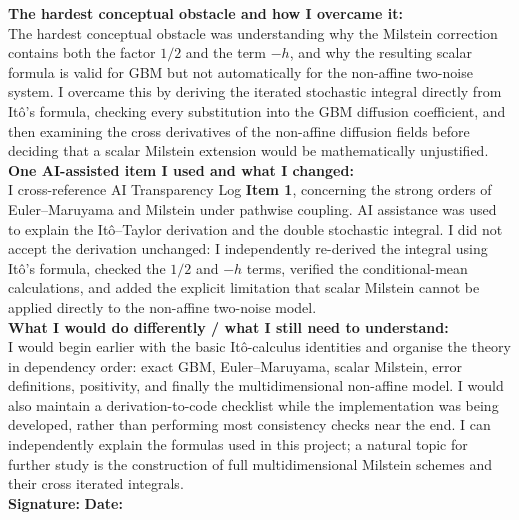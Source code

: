 \documentclass[11pt,a4paper]{article}
\theoremstyle{definition}
\theoremstyle{remark}
\begin{document}
\begin{formbox}
\begin{enumerate}[leftmargin=2em]
\end{enumerate}

\textbf{The hardest conceptual obstacle and how I overcame it:}\\
The hardest conceptual obstacle was understanding why the Milstein correction
contains both the factor $1/2$ and the term $-h$, and why the resulting scalar
formula is valid for GBM but not automatically for the non-affine two-noise
system. I overcame this by deriving the iterated stochastic integral directly
from It\^o's formula, checking every substitution into the GBM diffusion
coefficient, and then examining the cross derivatives of the non-affine
diffusion fields before deciding that a scalar Milstein extension would be
mathematically unjustified.\\[0.4em]

\textbf{One AI-assisted item I used and what I changed:}\\
I cross-reference AI Transparency Log \textbf{Item 1}, concerning the strong
orders of Euler--Maruyama and Milstein under pathwise coupling. AI assistance
was used to explain the It\^o--Taylor derivation and the double stochastic
integral. I did not accept the derivation unchanged: I independently
re-derived the integral using It\^o's formula, checked the $1/2$ and $-h$
terms, verified the conditional-mean calculations, and added the explicit
limitation that scalar Milstein cannot be applied directly to the non-affine
two-noise model.\\[0.4em]

\textbf{What I would do differently / what I still need to understand:}\\
I would begin earlier with the basic It\^o-calculus identities and organise
the theory in dependency order: exact GBM, Euler--Maruyama, scalar Milstein,
error definitions, positivity, and finally the multidimensional non-affine
model. I would also maintain a derivation-to-code checklist while the
implementation was being developed, rather than performing most consistency
checks near the end. I can independently explain the formulas used in this
project; a natural topic for further study is the construction of full
multidimensional Milstein schemes and their cross iterated integrals.\\[0.6em]

\textbf{Signature:} \underline{\hspace{4cm}}\qquad
\textbf{Date:} \underline{\hspace{2.5cm}}

\end{formbox}
\end{document}
